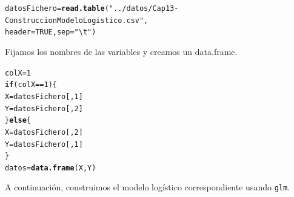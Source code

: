 \documentclass[10pt,a4paper]{article}\usepackage[]{graphicx}\usepackage[]{color}
\makeatletter
\newcommand{\hlnum}[1]{\textcolor[rgb]{0.686,0.059,0.569}{#1}}%
\newcommand{\hlstr}[1]{\textcolor[rgb]{0.192,0.494,0.8}{#1}}%
\newcommand{\hlopt}[1]{\textcolor[rgb]{0,0,0}{#1}}%
\newcommand{\hlstd}[1]{\textcolor[rgb]{0.345,0.345,0.345}{#1}}%
\newcommand{\hlkwa}[1]{\textcolor[rgb]{0.161,0.373,0.58}{\textbf{#1}}}%
\newcommand{\hlkwb}[1]{\textcolor[rgb]{0.69,0.353,0.396}{#1}}%
\newcommand{\hlkwc}[1]{\textcolor[rgb]{0.333,0.667,0.333}{#1}}%
\newcommand{\hlkwd}[1]{\textcolor[rgb]{0.737,0.353,0.396}{\textbf{#1}}}%
\newenvironment{kframe}{%
 \def\at@end@of@kframe{}%
 \ifinner\ifhmode%
  \def\at@end@of@kframe{\end{minipage}}%
  \begin{minipage}{\columnwidth}%
 \fi\fi%
 \def\FrameCommand##1{\hskip\@totalleftmargin \hskip-\fboxsep
 \colorbox{shadecolor}{##1}\hskip-\fboxsep
     \hskip-\linewidth \hskip-\@totalleftmargin \hskip\columnwidth}%
 \MakeFramed {\advance\hsize-\width
   \@totalleftmargin\z@ \linewidth\hsize
   \@setminipage}}%
 {\par\unskip\endMakeFramed%
 \at@end@of@kframe}
\newenvironment{knitrout}{}{} %
\newcounter {cont01}
\makeatother
\begin{document}
\begin{knitrout}
\color{fgcolor}\begin{kframe}
\begin{alltt}
\hlstd{datosFichero} \hlkwb{=} \hlkwd{read.table}\hlstd{(}\hlstr{"../datos/Cap13-ConstruccionModeloLogistico.csv"}\hlstd{,}
                          \hlkwc{header} \hlstd{=} \hlnum{TRUE}\hlstd{,} \hlkwc{sep}\hlstd{=}\hlstr{"\textbackslash{}t"}\hlstd{)}
\end{alltt}
\end{kframe}
\end{knitrout}


Fijamos los nombres de las variables y creamos un data.frame.

\begin{knitrout}
\color{fgcolor}\begin{kframe}
\begin{alltt}
\hlstd{colX} \hlkwb{=} \hlnum{1}
\hlkwa{if}\hlstd{(colX} \hlopt{==} \hlnum{1}\hlstd{)\{}
  \hlstd{X} \hlkwb{=} \hlstd{datosFichero[ ,} \hlnum{1}\hlstd{]}
  \hlstd{Y} \hlkwb{=} \hlstd{datosFichero[ ,} \hlnum{2}\hlstd{]}
\hlstd{\}} \hlkwa{else} \hlstd{\{}
  \hlstd{X} \hlkwb{=} \hlstd{datosFichero[ ,} \hlnum{2}\hlstd{]}
  \hlstd{Y} \hlkwb{=} \hlstd{datosFichero[ ,} \hlnum{1}\hlstd{]}
\hlstd{\}}
\hlstd{datos} \hlkwb{=} \hlkwd{data.frame}\hlstd{(X, Y)}
\end{alltt}
\end{kframe}
\end{knitrout}

A continuación, construimos el modelo logístico correspondiente usando {\tt glm}.
\end{document}
